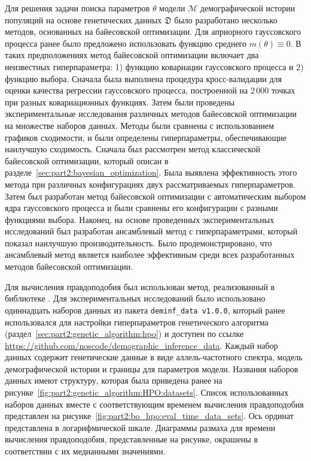 Для решения задачи поиска параметров $\theta$ модели $\mathcal{M}$ демографической истории популяций на основе генетических данных $\mathfrak{D}$ было разработано несколько методов, основанных на байесовской оптимизации.
Для априорного гауссовского процесса ранее было предложено использовать функцию среднего $m(\theta) \equiv 0$.
В таких предположениях метод байесовской оптимизации включает два неизвестных гиперпараметра: 1) функцию ковариации гауссовского процесса и 2) функцию выбора.
Сначала была выполнена процедура кросс-валидации для оценки качества регрессии гауссовского процесса, построенной на $2{\,}000$ точках при разных ковариационных функциях.
Затем были проведены экспериментальные исследования различных методов байесовской оптимизации на множестве наборов данных.
Методы были сравнены с использованием графиков сходимости, и были определены гиперпараметры, обеспечивающие наилучшую сходимость.
Сначала был рассмотрен метод классической байесовской оптимизации, который описан в разделе~\ref{sec:part2:bayesian_optimization}.
Была выявлена эффективность этого метода при различных конфигурациях двух рассматриваемых гиперпараметров.
Затем был разработан метод байесовской оптимизации с автоматическим выбором ядра гауссовского процесса и были сравнены его конфигурации с разными функциями выбора.
Наконец, на основе проведенных экспериментальных исследований был разработан ансамблевый метод с гиперпараметрами, который показал наилучшую производительность.
Было продемонстрировано, что ансамблевый метод является наиболее эффективным среди всех разработанных методов байесовской оптимизации.

Для вычисления правдоподобия был использован метод, реализованный в библиотеке \moments.
Для экспериментальных исследований было использовано одиннадцать наборов данных из пакета \texttt{deminf\_data v1.0.0}, который ранее использовался для настройки гиперпараметров генетического алгоритма (раздел~\ref{sec:part2:genetic_algorithm:hpo}) и доступен по ссылке \url{https://github.com/noscode/demographic_inference_data}.
Каждый набор данных содержит генетические данные в виде аллель-частотного спектра, модель демографической истории и границы для параметров модели.
Названия наборов данных имеют структуру, которая была приведена ранее на рисунке~\ref{fig:part2:genetic_algorithm:HPO:datasets}.
Список использованных наборов данных вместе с соответствующим временем вычисления правдоподобия представлен на рисунке~\ref{fig:part2:bo_hpo:eval_time_data_sets}.
Ось ординат представлена в логарифмической шкале.
Диаграммы размаха для времени вычисления правдоподобия, представленные на рисунке, окрашены в соответствии с их медианными значениями.

